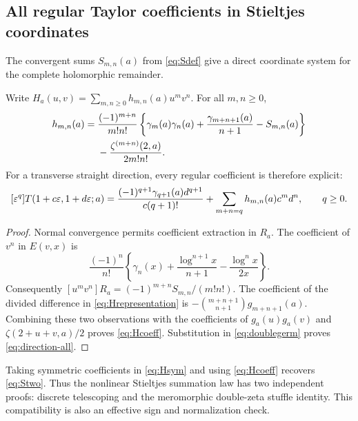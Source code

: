 \subsection{All regular Taylor coefficients in Stieltjes coordinates}

The convergent sums $S_{m,n}(a)$ from \eqref{eq:Sdef} give a direct
coordinate system for the complete holomorphic remainder.

\begin{theorem}\label{thm:Hcoeff}
Write $H_a(u,v)=\sum_{m,n\ge0}h_{m,n}(a)u^mv^n$. For all $m,n\ge0$,
\begin{align}\label{eq:Hcoeff}
 h_{m,n}(a)
 ={}&\frac{(-1)^{m+n}}{m!n!}
 \left\{\gamma_m(a)\gamma_n(a)
          +\frac{\gamma_{m+n+1}(a)}{n+1}-S_{m,n}(a)\right\}\notag\\
 &-\frac{\zeta^{(m+n)}(2,a)}{2m!n!}.
\end{align}
For a transverse straight direction, every regular coefficient is
therefore explicit:
\begin{equation}\label{eq:direction-all}
 [\varepsilon^q]T(1+c\varepsilon,1+d\varepsilon;a)
 =\frac{(-1)^{q+1}\gamma_{q+1}(a)d^{q+1}}{c(q+1)!}
       +\sum_{m+n=q}h_{m,n}(a)c^md^n,
 \qquad q\ge0.
\end{equation}
\end{theorem}
\begin{proof}
Normal convergence permits coefficient extraction in $R_a$. The
coefficient of $v^n$ in $E(v,x)$ is
\[
 \frac{(-1)^n}{n!}\left\{
 \gamma_n(x)+\frac{\log^{n+1}x}{n+1}-\frac{\log^n x}{2x}\right\}.
\]
Consequently $[u^mv^n]R_a=(-1)^{m+n}S_{m,n}/(m!n!)$.
The coefficient of the divided difference in
\eqref{eq:Hrepresentation} is
$-\binom{m+n+1}{n+1}g_{m+n+1}(a)$. Combining these two observations
with the coefficients of $g_a(u)g_a(v)$ and
$\zeta(2+u+v,a)/2$ proves \eqref{eq:Hcoeff}. Substitution in
\eqref{eq:doublegerm} proves \eqref{eq:direction-all}.
\end{proof}

Taking symmetric coefficients in \eqref{eq:Hsym} and using
\eqref{eq:Hcoeff} recovers \eqref{eq:Stwo}. Thus the nonlinear
Stieltjes summation law has two independent proofs: discrete telescoping
and the meromorphic double-zeta stuffle identity. This compatibility is
also an effective sign and normalization check.

